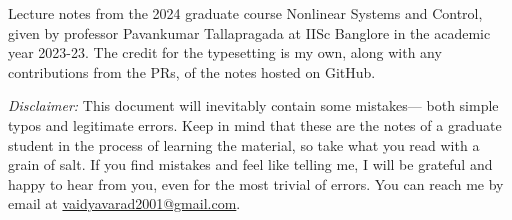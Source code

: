 Lecture notes from the 2024 graduate course Nonlinear Systems and Control, given by professor
Pavankumar Tallapragada at IISc Banglore in the academic year 2023-23. The credit for the typesetting is my own,
along with any contributions from the PRs, of the notes hosted
on GitHub.

\textit{Disclaimer:} This document will inevitably contain some mistakes— both
simple typos and legitimate errors. Keep in mind that these are the notes of a graduate student in the process of learning the material, so take
what you read with a grain of salt. If you find mistakes and feel like telling
me, I will be grateful and happy to hear from you, even for the most trivial of
errors. You can reach me by email at
\href{mailto:vaidyavarad2001@gmail.com}{vaidyavarad2001@gmail.com}.